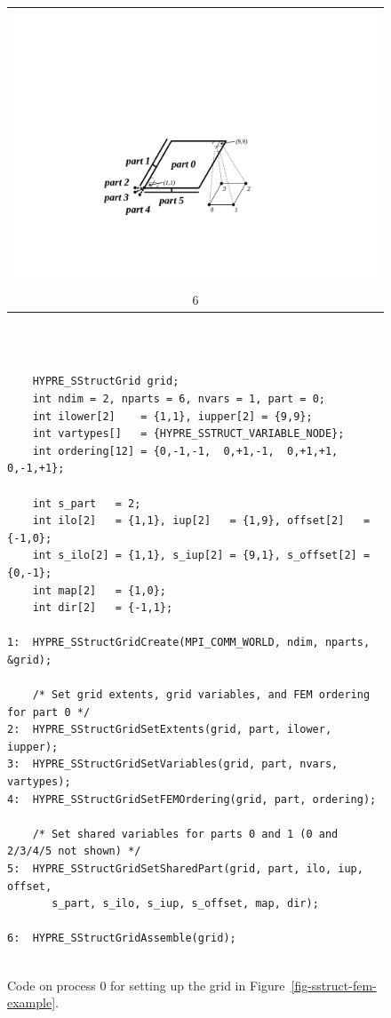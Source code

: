\begin{figure}
\begin{tabular}{@{}c@{}}
\end{tabular}
\hfill
\begin{tabular}{@{}c@{}}
\includegraphics[width=.32\textwidth]{figSStructGridFEM6} \\ 6
\end{tabular}
\vspace{2em} \\
\begin{minipage}{0.9\textwidth}
\begin{verbatim}
    
    HYPRE_SStructGrid grid;
    int ndim = 2, nparts = 6, nvars = 1, part = 0;
    int ilower[2]    = {1,1}, iupper[2] = {9,9};
    int vartypes[]   = {HYPRE_SSTRUCT_VARIABLE_NODE};
    int ordering[12] = {0,-1,-1,  0,+1,-1,  0,+1,+1,  0,-1,+1};

    int s_part   = 2;
    int ilo[2]   = {1,1}, iup[2]   = {1,9}, offset[2]   = {-1,0};
    int s_ilo[2] = {1,1}, s_iup[2] = {9,1}, s_offset[2] = {0,-1};
    int map[2]   = {1,0};
    int dir[2]   = {-1,1};

1:  HYPRE_SStructGridCreate(MPI_COMM_WORLD, ndim, nparts, &grid);
    
    /* Set grid extents, grid variables, and FEM ordering for part 0 */
2:  HYPRE_SStructGridSetExtents(grid, part, ilower, iupper);
3:  HYPRE_SStructGridSetVariables(grid, part, nvars, vartypes);
4:  HYPRE_SStructGridSetFEMOrdering(grid, part, ordering);

    /* Set shared variables for parts 0 and 1 (0 and 2/3/4/5 not shown) */
5:  HYPRE_SStructGridSetSharedPart(grid, part, ilo, iup, offset,
       s_part, s_ilo, s_iup, s_offset, map, dir);

6:  HYPRE_SStructGridAssemble(grid);
    
\end{verbatim}
\end{minipage}
\caption{%
Code on process 0 for setting up the grid in Figure~\ref{fig-sstruct-fem-example}.}
\label{fig-sstruct-fem-grid}
\end{figure}

